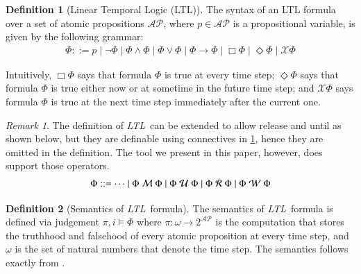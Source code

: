 \documentclass[preprint,12pt]{elsarticle}
\theoremstyle{definition}
\newtheorem{definition}{Definition}[section]
\theoremstyle{remark}
\newtheorem{remark}{Remark}[section]
\newcommand{\AP}{\mathcal{AP}}
\newcommand{\always}{\Box}
\newcommand{\eventually}{\Diamond}
\newcommand{\nextt}{\mathcal{X}}
\newcommand{\limplies}{\rightarrow}
\newcommand{\ltl}{\textit{LTL}}
\newcommand{\stronguntil}{\hspace{0.1cm} \mathcal{U}  \hspace{0.1cm}}
\newcommand{\strongrelease}{\hspace{0.1cm} \mathcal{M} \hspace{0.1cm}}
\newcommand{\weakuntil}{\hspace{0.1cm} \mathcal{W} \hspace{0.1cm}}
\newcommand{\weakrelease}{\hspace{0.1cm} \mathcal{R} \hspace{0.1cm}}
\begin{document}
\begin{definition}[Linear Temporal Logic (LTL)]
    The syntax of an LTL formula over a set of atomic propositions $\AP$, where $p\in\AP$ is a propositional variable, is given by the following grammar:
    \begin{align*}
        \Phi ::= p \mid \neg \Phi \mid \Phi \land \Phi \mid \Phi \lor \Phi \mid \Phi \limplies \Phi \mid \always \Phi \mid \eventually \Phi \mid \nextt \Phi
    \end{align*}\label{ltl-defn}
\end{definition}
Intuitively, $\always \Phi$ says that formula $\Phi$ is true at every time step; $\eventually \Phi$ says that formula $\Phi$ is true either now or at sometime in the future time step; and $\nextt \Phi$ says formula $\Phi$ is true at the next time step immediately after the current one.
\begin{remark}
    The definition of \ltl\ can be extended to allow release and until as shown below, but they are definable using connectives in \cref{ltl-defn}, hence they are omitted in the definition. The tool we present in this paper, however, does support those operators.
    \begin{align*}
        \Phi ::= \cdots \mid \Phi \strongrelease \Phi \mid \Phi \stronguntil \Phi \mid \Phi \weakrelease \Phi \mid \Phi \weakuntil \Phi
    \end{align*}
\end{remark}

\begin{definition}[Semantics of \ltl\ formula]
    The semantics of \ltl\ formula is defined via judgement $\pi, i \models \Phi$ where $\pi : \omega \rightarrow 2^{\AP}$ is the computation that stores the truthhood and falsehood of every atomic proposition at every time step, and $\omega$ is the set of natural numbers that denote the time step. The semantics follows exactly from \cite{Roz11}.
\end{definition}
\end{document}
